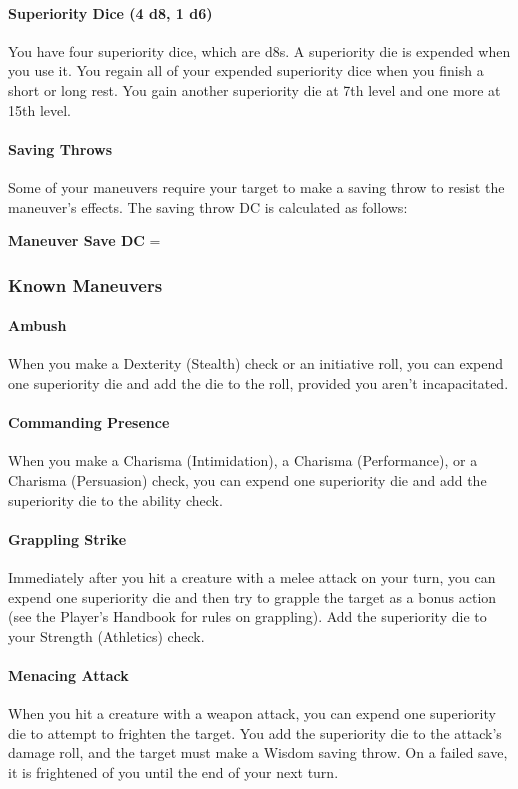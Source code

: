 {\paragraph*{Superiority Dice (4 d8, 1 d6)} You have four superiority dice, which are d8s. A superiority die is expended when you use it. You regain all of your expended superiority dice when you finish a short or long rest. You gain another superiority die at 7th level and one more at 15th level.

\paragraph*{Saving Throws} Some of your maneuvers require your target to make a saving throw to resist the maneuver's effects. The saving throw DC is calculated as follows:

\textbf{Maneuver Save DC} = 
\subsubsection*{Known Maneuvers}
\paragraph*{Ambush}
When you make a Dexterity (Stealth) check or an initiative roll, you can expend one superiority die and add the die to the roll, provided you aren't incapacitated.
\paragraph*{Commanding Presence}
When you make a Charisma (Intimidation), a Charisma (Performance), or a Charisma (Persuasion) check, you can expend one superiority die and add the superiority die to the ability check.
\paragraph*{Grappling Strike}
Immediately after you hit a creature with a melee attack on your turn, you can expend one superiority die and then try to grapple the target as a bonus action (see the Player's Handbook for rules on grappling). Add the superiority die to your Strength (Athletics) check.
\paragraph*{Menacing Attack}
When you hit a creature with a weapon attack, you can expend one superiority die to attempt to frighten the target. You add the superiority die to the attack's damage roll, and the target must make a Wisdom saving throw. On a failed save, it is frightened of you until the end of your next turn.
}
